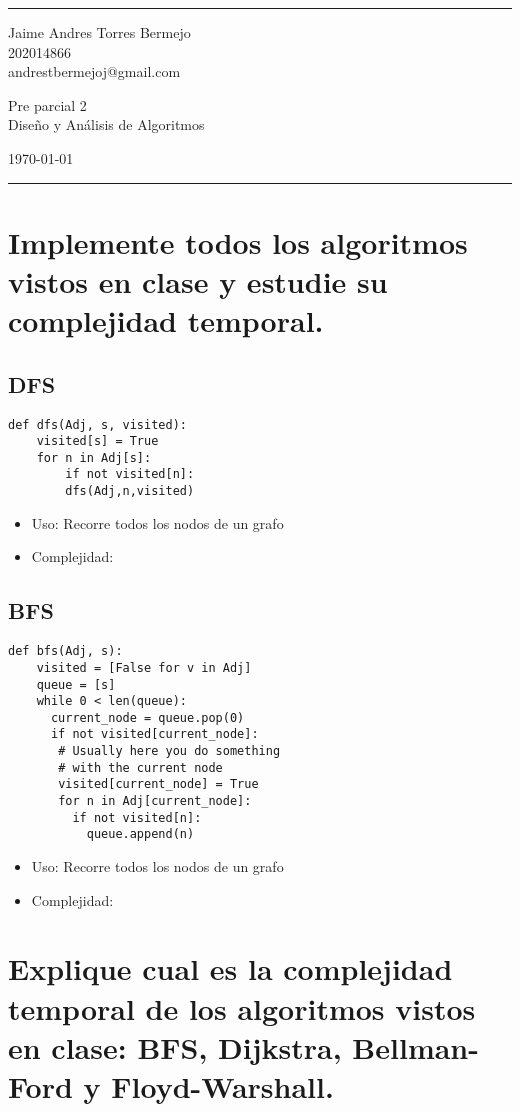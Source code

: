 \documentclass[a4paper]{article}
\begin{document}

\fancyhead[C]{}
\hrule \medskip %
\begin{minipage}{0.295\textwidth} 
\raggedright
\footnotesize
Jaime Andres Torres Bermejo \hfill\\   
202014866\hfill\\
andrestbermejoj@gmail.com
\end{minipage}
\begin{minipage}{0.4\textwidth} 
\centering 
\large 
Pre parcial 2\\ 
\normalsize 
Diseño y Análisis de Algoritmos\\ 
\end{minipage}
\begin{minipage}{0.295\textwidth} 
\raggedleft
\today\hfill\\
\end{minipage}
\medskip\hrule 
\bigskip

\section{Implemente todos los algoritmos vistos en clase y estudie su complejidad temporal.}
\subsection{DFS}
\begin{verbatim}
def dfs(Adj, s, visited): 
    visited[s] = True
    for n in Adj[s]:
        if not visited[n]:
        dfs(Adj,n,visited)
\end{verbatim}

\begin{itemize}
    \item Uso: Recorre todos los nodos de un grafo
    \item Complejidad:
    
\end{itemize}

\subsection{BFS}
\begin{verbatim}
def bfs(Adj, s): 
    visited = [False for v in Adj] 
    queue = [s]
    while 0 < len(queue): 
      current_node = queue.pop(0)
      if not visited[current_node]:
       # Usually here you do something 
       # with the current node
       visited[current_node] = True
       for n in Adj[current_node]:
         if not visited[n]:
           queue.append(n)
\end{verbatim}

\begin{itemize}
    \item Uso: Recorre todos los nodos de un grafo
    \item Complejidad:
    
\end{itemize}

\section{Explique cual es la complejidad temporal de los algoritmos vistos en clase: BFS,
Dijkstra, Bellman-Ford y Floyd-Warshall.}

\end{document}
